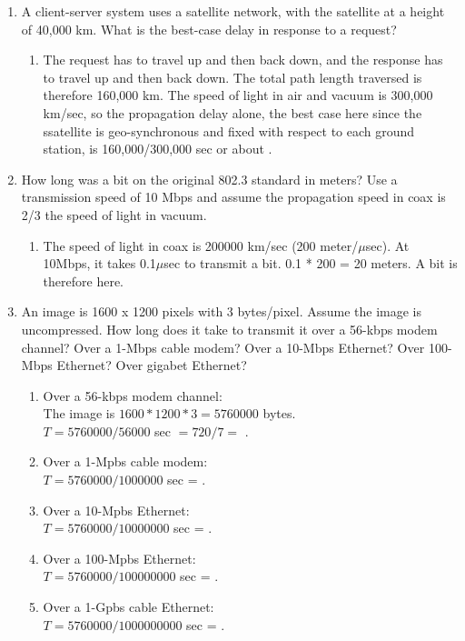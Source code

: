 \documentclass[12pt]{article}
\begin{document}
\begin{enumerate}
\item A client-server system uses a satellite network, with the satellite at a height of 40,000 km. What is the best-case delay in response to a request?
  \begin{enumerate}
  \item The request has to travel up and then back down, and the response has to travel up and then back down. The total path length traversed is therefore 160,000 km. The speed of light in air and vacuum is 300,000 km/sec, so the propagation delay alone, the best case here since the ssatellite is geo-synchronous and fixed with respect to each ground station, is 160,000/300,000 sec or about .
  \end{enumerate}
\item How long was a bit on the original 802.3 standard in meters? Use a transmission speed of 10 Mbps and assume the propagation speed in coax is 2/3 the speed of light in vacuum.
  \begin{enumerate}
  \item The speed of light in coax is 200000 km/sec (200 meter/$\mu$sec). At 10Mbps, it takes 0.1$\mu$sec to transmit a bit. 0.1 * 200 = 20 meters. A bit is therefore  here.
  \end{enumerate}
\item An image is 1600 x 1200 pixels with 3 bytes/pixel. Assume the image is uncompressed. How long does it take to transmit it over a 56-kbps modem channel? Over a 1-Mbps cable modem? Over a 10-Mbps Ethernet? Over 100-Mbps Ethernet? Over gigabet Ethernet?
  \begin{enumerate}
    \item Over a 56-kbps modem channel: \\
      The image is $1600 * 1200 * 3 = 5760000$ bytes. \\
      $T = 5760000/56000$ sec $ = 720 / 7 = $ .
    \item Over a 1-Mpbs cable modem: \\
      $T = 5760000/1000000$ sec = .
    \item Over a 10-Mpbs Ethernet: \\
      $T = 5760000/10000000$ sec = .
    \item Over a 100-Mpbs Ethernet: \\
      $T = 5760000/100000000$ sec = .
    \item Over a 1-Gpbs cable Ethernet: \\
      $T = 5760000/1000000000$ sec = .
    \end{enumerate}
\end{enumerate}
\end{document}
